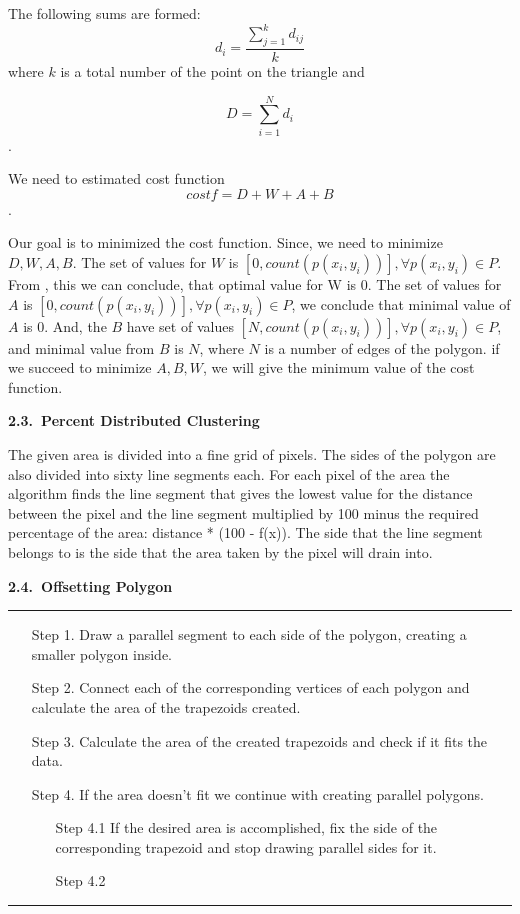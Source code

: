 \documentclass[11pt,leqno]{book}
\newcommand{\subsect}[1]{\vskip 3mm\par{\bf#1}}
\begin{document}
The  following sums are formed: $$d_i = \frac{\sum_{j=1}^k d_{ij}}k$$
where $k$ is a  total number of the point on the triangle  and

$$D = \sum_{i=1}^N d_i$$.

We need to estimated cost function
$$cost f = D+W + A + B$$.

Our goal is to minimized the cost function. Since, we need to minimize $D, W, A, B$. The set of values for $W$ is $[0, count( p(x_i, y_i))], \forall p(x_i, y_i) \in P$. From , this we can conclude, that optimal value for W is 0.
The set of values for $A$ is $[0, count (p(x_i, y_i))], \forall p(x_i, y_i) \in P$, we conclude that minimal value of $A$ is 0. And, the $B$ have set of values $[N,count( p(x_i, y_i))], \forall p(x_i, y_i) \in P$, and minimal value from $B$ is $N$, where $N$ is a number of edges of the polygon.
if we succeed to minimize $A, B, W$, we will give the minimum value of the cost function.

\subsect{2.3.~Percent Distributed Clustering}

The given area is divided into a fine grid of pixels. The sides of the polygon are also divided into sixty line segments each. For each pixel of the area the algorithm finds the line segment that gives the lowest value for the distance between the pixel and the line segment multiplied by 100 minus the required percentage of the area: distance * (100 - f(x)). The side that the line segment belongs to is the side that the area taken by the pixel will drain into.

\subsect{2.4.~Offsetting Polygon}

\noindent\rule{\textwidth}{1pt}
\begin{itemize}
\item[Step 1.] Draw a parallel segment to each side of the polygon, creating a smaller polygon inside. 
\item[Step 2.] Connect each of the corresponding vertices of each polygon and calculate the area of the trapezoids created.
\item[Step 3.] Calculate the area of the created trapezoids and check if it fits the data.
\item[Step 4.] If the area doesn’t fit we continue with creating parallel polygons.
\begin{itemize}
  \item[Step 4.1] If the desired area is accomplished, fix the side of the corresponding trapezoid and stop drawing parallel sides for it.
  \item[Step 4.2] 
\end{itemize}
\end{itemize}
\noindent\rule{\textwidth}{1pt}
\end{document}
